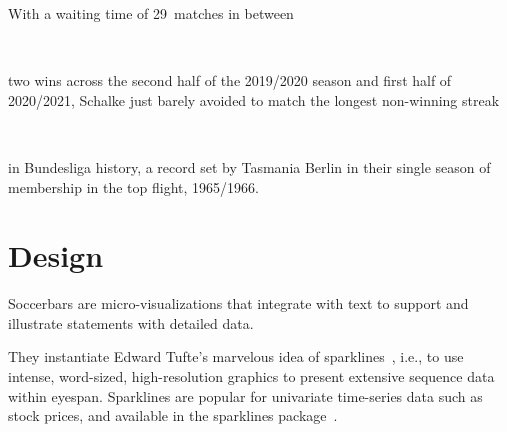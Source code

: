 \documentclass[a4paper,12pt]{ltxdoc}
\begin{document}
With a waiting time of {\color{schalke}29~matches} in between
{\sbZeroDots\begin{soccerbarenv}[schalke]
   
   
   
   
\end{soccerbarenv}\,%
\begin{soccerbarenv}[schalke]
   
   
   
    
\end{soccerbarenv}}
two wins across the second half of the 2019/2020 season and first half of 2020/2021,
Schalke just barely avoided to match the longest non-winning streak
{\sbZeroDots\begin{soccerbarenv}[schalke]
   
   
   
   
\end{soccerbarenv}\,%
\begin{soccerbarenv}[schalke]
   
   
   
    
\end{soccerbarenv}}
in Bundesliga history, a record set by Tasmania Berlin
in their single season of membership
in the top flight, 1965/1966.


\section{Design}\label{sec:design}

Soccerbars are micro-visualizations
that integrate with text
to support and illustrate statements with detailed data.

They instantiate Edward Tufte's marvelous idea of sparklines~\cite{tufte},
i.e., to use intense, word-sized, high-resolution graphics
to present extensive sequence data within eyespan.
Sparklines are popular for univariate time-series data such as stock prices,
and available in the \textsf{sparklines} package~\cite{sparklines}.
\end{document}
